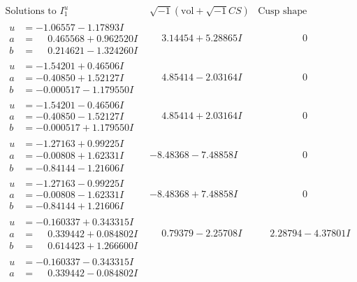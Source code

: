 \documentclass[1p]{elsarticle_modified}
\theoremstyle{definition}
\newcommand{\I}{\sqrt{-1}}
\begin{document}
$$\begin{array}{c|c|c}
\text{Solutions to }I^u_{1}& \I (\text{vol} + \sqrt{-1}CS) & \text{Cusp shape}\\
 \hline 
\begin{aligned}
u &= -1.06557 - 1.17893 I \\
a &= \phantom{-}0.465568 + 0.962520 I \\
b &= \phantom{-}0.214621 - 1.324260 I\end{aligned}
 & \phantom{-}3.14454 + 5.28865 I & \phantom{-0.000000 } 0 \\ \hline\begin{aligned}
u &= -1.54201 + 0.46506 I \\
a &= -0.40850 + 1.52127 I \\
b &= -0.000517 - 1.179550 I\end{aligned}
 & \phantom{-}4.85414 - 2.03164 I & \phantom{-0.000000 } 0 \\ \hline\begin{aligned}
u &= -1.54201 - 0.46506 I \\
a &= -0.40850 - 1.52127 I \\
b &= -0.000517 + 1.179550 I\end{aligned}
 & \phantom{-}4.85414 + 2.03164 I & \phantom{-0.000000 } 0 \\ \hline\begin{aligned}
u &= -1.27163 + 0.99225 I \\
a &= -0.00808 + 1.62331 I \\
b &= -0.84144 - 1.21606 I\end{aligned}
 & -8.48368 - 7.48858 I & \phantom{-0.000000 } 0 \\ \hline\begin{aligned}
u &= -1.27163 - 0.99225 I \\
a &= -0.00808 - 1.62331 I \\
b &= -0.84144 + 1.21606 I\end{aligned}
 & -8.48368 + 7.48858 I & \phantom{-0.000000 } 0 \\ \hline\begin{aligned}
u &= -0.160337 + 0.343315 I \\
a &= \phantom{-}0.339442 + 0.084802 I \\
b &= \phantom{-}0.614423 + 1.266600 I\end{aligned}
 & \phantom{-}0.79379 - 2.25708 I & \phantom{-}2.28794 - 4.37801 I \\ \hline\begin{aligned}
u &= -0.160337 - 0.343315 I \\
a &= \phantom{-}0.339442 - 0.084802 I \\

\end{aligned}
\end{array}$$
\end{document}
